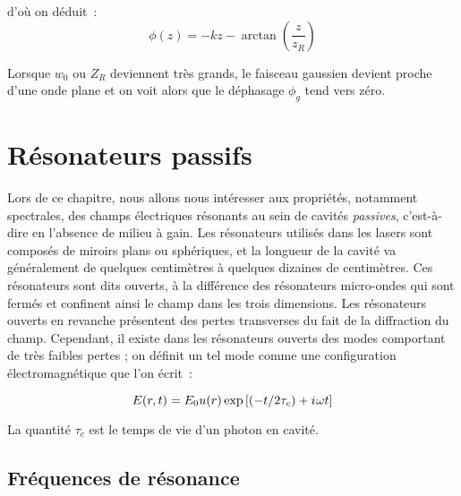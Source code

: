 \documentclass[a4paper]{book}
\newcommand{\iu}{{i\mkern1mu}}
\begin{document}
d'où on déduit~:
\begin{equation}
    \phi(z) = -kz-\arctan\left(\frac{z}{z_R}\right)
\end{equation}

Lorsque $w_0$ ou $Z_R$ deviennent très grands, le faisceau gaussien devient proche d'une onde plane et on voit alors que le déphasage $\phi_g$ tend vers zéro.

\chapter{Résonateurs passifs}

Lors de ce chapitre, nous allons nous intéresser aux propriétés, notamment spectrales, des champs électriques résonants au sein de cavités \textit{passives}, c'est-à-dire en l'absence de milieu à gain. 
Les résonateurs utilisés dans les lasers sont composés de miroirs plans ou sphériques, et la longueur de la cavité va généralement de quelques centimètres à quelques dizaines de centimètres. 
Ces résonateurs sont dits ouverts, à la différence des résonateurs micro-ondes qui sont fermés et confinent ainsi le champ dans les trois dimensions. Les résonateurs ouverts en revanche présentent des pertes transverses du fait de la diffraction du champ. Cependant, il existe dans les résonateurs ouverts des modes comportant de très faibles pertes ; on définit un tel mode comme une configuration électromagnétique que l'on écrit~:

\begin{equation}
    E(r,t)=E_0u(r)\exp\left[(-t/2\tau_c)+\iu \omega t\right]
\end{equation}

La quantité $\tau_c$ est le temps de vie d'un photon en cavité.

\section{Fréquences de résonance}
\end{document}
